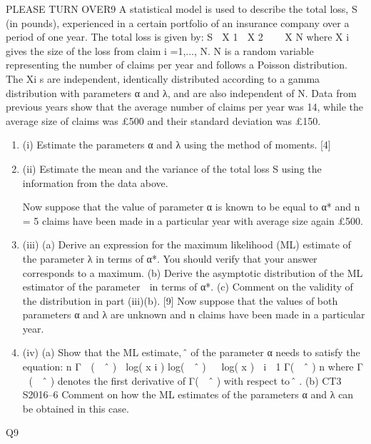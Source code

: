 \documentclass[a4paper,12pt]{article}
\begin{document}
PLEASE TURN OVER9
A statistical model is used to describe the total loss, S (in pounds), experienced in a
certain portfolio of an insurance company over a period of one year. The total loss is
given by:
S  X 1  X 2    X N
where X i gives the size of the loss from claim i =1,..., N. N is a random variable
representing the number of claims per year and follows a Poisson distribution. The
Xi s are independent, identically distributed according to a gamma distribution with
parameters α and λ, and are also independent of N.
Data from previous years show that the average number of claims per year was 14,
while the average size of claims was £500 and their standard deviation was £150.
\begin{enumerate}
\item (i) Estimate the parameters α and λ using the method of moments.
[4]
\item
(ii) Estimate the mean and the variance of the total loss S using the information from the data above.

Now suppose that the value of parameter α is known to be equal to α* and
n = 5 claims have been made in a particular year with average size again £500.

\item (iii)
(a) Derive an expression for the maximum likelihood (ML) estimate of the parameter λ in terms of α*. You should verify that your answer corresponds to a maximum.
(b) Derive the asymptotic distribution of the ML estimator of the parameter  in terms of α*.
(c) Comment on the validity of the distribution in part (iii)(b).
[9]
Now suppose that the values of both parameters α and λ are unknown and n claims
have been made in a particular year.
\item (iv)
(a)
Show that the ML estimate, ̂ of the parameter α needs to satisfy the
equation:
n
Γ  (  ˆ )
 log( x i )
log(  ˆ ) 
 log( x )  i  1
Γ(  ˆ )
n
where Γ  (  ˆ ) denotes the first derivative of Γ(  ˆ ) with respect to ̂ .
(b)
CT3 S2016–6
Comment on how the ML estimates of the parameters α and λ can be
obtained in this case.
\end{enumerate}
\newpage
Q9
\end{document}
